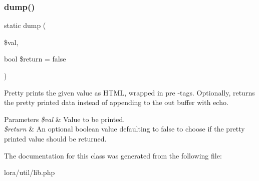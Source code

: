 \subsubsection{dump()}
{\footnotesize\ttfamily static dump (\begin{DoxyParamCaption}\item[{}]{\$val,  }\item[{bool}]{\$return = {\ttfamily false} }\end{DoxyParamCaption})\hspace{0.3cm}{\ttfamily [static]}}

Pretty prints the given value as H\+T\+ML, wrapped in pre -\/tags. Optionally, returns the pretty printed data instead of appending to the out buffer with echo. 
\begin{DoxyParams}{Parameters}
{\em \$val} & Value to be printed. \\
\hline
{\em \$return} & An optional boolean value defaulting to false to choose if the pretty printed value should be returned. \\
\hline
\end{DoxyParams}



The documentation for this class was generated from the following file\+:\begin{DoxyCompactItemize}
\item 
lora/util/lib.\+php\end{DoxyCompactItemize}
